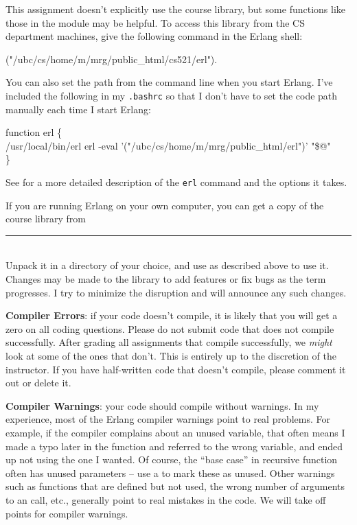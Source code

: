\documentclass{article}
\begin{document}
This assignment doesn't explicitly use the course library, but some functions like those in the
 module may
be helpful.
To access this library from the CS department machines, give the following command in the Erlang shell:
\begin{xcode}
  \eprompt{} \addpath{}("/ubc/cs/home/m/mrg/public\_html/cs521/erl").
\end{xcode}
You can also set the path from the command line when you start Erlang.  I've
included the following in my \texttt{.bashrc} so that I don't have to set the
code path manually each time I start Erlang:
\begin{xcode}
  function erl \{\\
  \>/usr/local/bin/erl erl -eval '\addpath{}("/ubc/cs/home/m/mrg/public\_html/erl")' "\$@"\\
  \}  
\end{xcode}
See  for a more detailed description of
the \texttt{erl} command and the options it takes.

If you are running Erlang on your own computer, you can get a copy of the course library from\\
\rule{1.5em}{0ex}\\
Unpack it in a directory of your choice, and use \code{\addpath{}} as described above
to use it.  Changes may be made to the library to add features or fix bugs as the term progresses.
I try to minimize the disruption and will announce any such changes.

\textbf{Compiler Errors}: if your code doesn't compile, it is likely that you
will get a zero on all coding questions.
Please do not submit code that does not compile successfully.
After grading all assignments that compile successfully,
we \emph{might} look at some of the ones that don't.
This is entirely up to the discretion of the instructor.
If you have half-written code that doesn't compile, please comment
it out or delete it.

\textbf{Compiler Warnings}: your code should compile without warnings.
In my experience, most of the Erlang compiler warnings point to real problems.
For example, if the compiler complains about an unused variable, that often
means I made a typo later in the function and referred to the wrong variable,
and ended up not using the one I wanted.  Of course, the ``base case'' in recursive
function often has unused parameters -- use a \code{\_} to mark these as unused.
Other warnings such as functions that are defined but not used, the wrong number
of arguments to an
call, etc., generally point to real mistakes
in the code.  We will take off points for compiler warnings.
\end{document}
